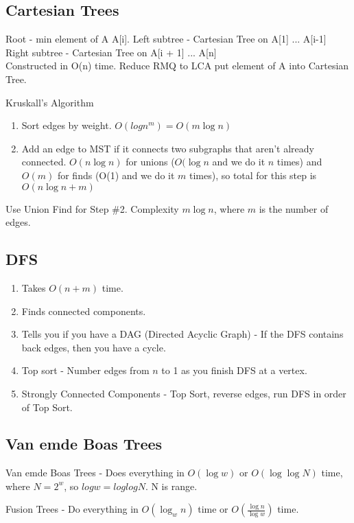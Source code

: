 \documentclass[9pt,twocolumn]{article}
\begin{document}
\subsection{Cartesian Trees}
Root - min element of A A[i].  Left subtree - Cartesian Tree on A[1] ... A[i-1]
Right subtree - Cartesian Tree on A[i + 1] ... A[n]\\
Constructed in O(n) time.
Reduce RMQ to LCA put element of A into Cartesian Tree.



Kruskall's Algorithm
\begin{enumerate}
    \item Sort edges by weight. $O(logn^m) = O(m\log{n})$
    \item Add an edge to MST if it connects two subgraphs that aren't already connected. $O(n\log{n})$ for
        unions ($O(\log{n}$ and we do it $n$ times) and $O(m)$ for finds (O(1) and we do it $m$ times), so total for this step is $O(n\log{n}+m)$
\end{enumerate}

Use Union Find for Step \#2. Complexity $m \log n$, where $m$ is the number of edges.

\subsection{DFS}
\begin{enumerate}
    \item Takes $O(n+m)$ time.
    \item Finds connected components.
    \item Tells you if you have a DAG (Directed Acyclic Graph) - If the DFS contains back edges, then you have a cycle.
    \item Top sort - Number edges from $n$ to 1 as you finish DFS at a vertex.
    \item Strongly Connected Components - Top Sort, reverse edges, run DFS in order of Top Sort.
\end{enumerate}

\subsection{Van emde Boas Trees}

Van emde Boas Trees - Does everything in $O(\log w)$ or $O(\log \log N)$ time,
where $N = 2^w$, so $logw = loglogN$. N is range.

Fusion Trees - Do everything in $O(\log_{w}{n})$ time or $O(\frac{\log{n}}{\log{w}})$ time.
\end{document}
